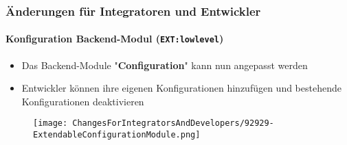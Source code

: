%

\begin{frame}[fragile]
	\frametitle{Änderungen für Integratoren und Entwickler}
	\framesubtitle{Konfiguration Backend-Modul (\texttt{EXT:lowlevel})}

	\lstset{basicstyle=\tiny\ttfamily}

	\begin{itemize}
		\item Das Backend-Module "\textbf{Configuration}" kann nun angepasst werden
		\item Entwickler können ihre eigenen Konfigurationen hinzufügen und bestehende Konfigurationen deaktivieren
	\end{itemize}

	\begin{figure}
		\texttt{[image: ChangesForIntegratorsAndDevelopers/92929-ExtendableConfigurationModule.png]}
	\end{figure}

\end{frame}

